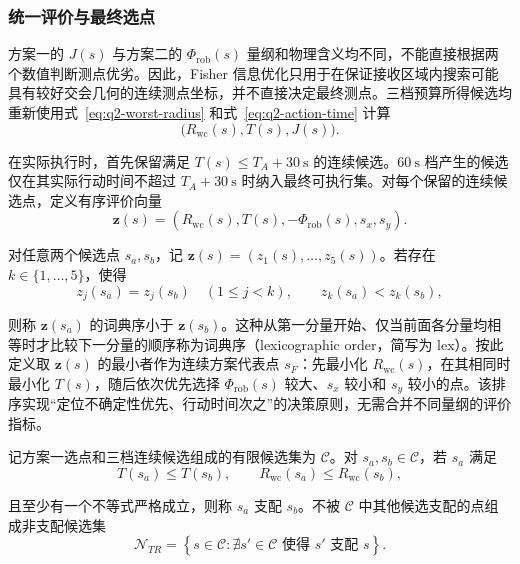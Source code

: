 \documentclass[withoutpreface,bwprint]{cumcmthesis}
\begin{document}
\subsubsection{统一评价与最终选点}

方案一的 $J(s)$ 与方案二的 $\Phi_{\mathrm{rob}}(s)$ 量纲和物理含义均不同，不能直接根据两个数值判断测点优劣。因此，Fisher 信息优化只用于在保证接收区域内搜索可能具有较好交会几何的连续测点坐标，并不直接决定最终测点。三档预算所得候选均重新使用式~\eqref{eq:q2-worst-radius} 和式~\eqref{eq:q2-action-time} 计算
\begin{equation}
  \bigl(R_{\mathrm{wc}}(s),T(s),J(s)\bigr).
\end{equation}

在实际执行时，首先保留满足 $T(s)\leq T_A+30\ \mathrm{s}$ 的连续候选。$60\ \mathrm{s}$ 档产生的候选仅在其实际行动时间不超过 $T_A+30\ \mathrm{s}$ 时纳入最终可执行集。对每个保留的连续候选点，定义有序评价向量
\begin{equation}
  \boldsymbol z(s)=\left(R_{\mathrm{wc}}(s),T(s),
  -\Phi_{\mathrm{rob}}(s),s_x,s_y\right).
\end{equation}

对任意两个候选点 $s_a,s_b$，记 $\boldsymbol z(s)=(z_1(s),\ldots,z_5(s))$。若存在 $k\in\{1,\ldots,5\}$，使得
\begin{equation}
  z_j(s_a)=z_j(s_b)\quad(1\leq j<k),
  \qquad z_k(s_a)<z_k(s_b),
  \label{eq:q2-lex-order}
\end{equation}

则称 $\boldsymbol z(s_a)$ 的词典序小于 $\boldsymbol z(s_b)$。这种从第一分量开始、仅当前面各分量均相等时才比较下一分量的顺序称为词典序（lexicographic order，简写为 $\mathrm{lex}$）。按此定义取 $\boldsymbol z(s)$ 的最小者作为连续方案代表点 $s_F$：先最小化 $R_{\mathrm{wc}}(s)$，在其相同时最小化 $T(s)$，随后依次优先选择 $\Phi_{\mathrm{rob}}(s)$ 较大、$s_x$ 较小和 $s_y$ 较小的点。该排序实现“定位不确定性优先、行动时间次之”的决策原则，无需合并不同量纲的评价指标。

记方案一选点和三档连续候选组成的有限候选集为 $\mathcal C$。对 $s_a,s_b\in\mathcal C$，若 $s_a$ 满足
\begin{equation}
  T(s_a)\leq T(s_b),\qquad
  R_{\mathrm{wc}}(s_a)\leq R_{\mathrm{wc}}(s_b),
\end{equation}

且至少有一个不等式严格成立，则称 $s_a$ 支配 $s_b$。不被 $\mathcal C$ 中其他候选支配的点组成非支配候选集
\begin{equation}
  \mathcal N_{TR}
  =\left\{s\in\mathcal C:\nexists s'\in\mathcal C
  \text{ 使得 $s'$ 支配 $s$}
  \right\}.
  \label{eq:q2-nondominated-set}
\end{equation}
\end{document}
